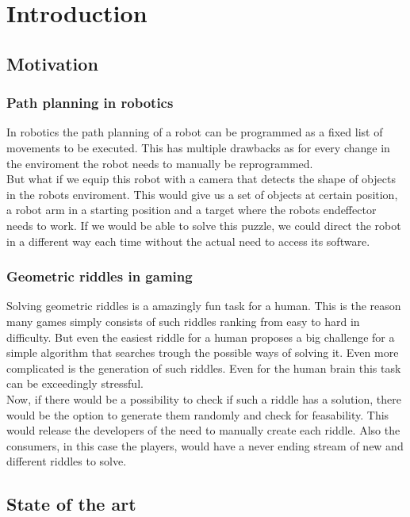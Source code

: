 \chapter{Introduction}
\label{cha:Introduction}

\section{Motivation}
\subsection{Path planning in robotics}
In robotics the path planning of a robot can be programmed as a fixed list of movements to be executed. This has multiple drawbacks as for every change in the enviroment the robot needs to manually be reprogrammed.\\
But what if we equip this robot with a camera that detects the shape of objects in the robots enviroment. This would give us a set of objects at certain position, a robot arm in a starting position and a target where the robots endeffector needs to work. If we would be able to solve this puzzle, we could direct the robot in a different way each time without the actual need to access its software.


\subsection{Geometric riddles in gaming}
Solving geometric riddles is a amazingly fun task for a human. This is the reason many games simply consists of such riddles ranking from easy to hard in difficulty. But even the easiest riddle for a human proposes a big challenge for a simple algorithm that searches trough the possible ways of solving it. Even more complicated is the generation of such riddles. Even for the human brain this task can be exceedingly stressful.\\
 Now, if there would be a possibility to check if such a riddle has a solution, there would be the option to generate them randomly and check for feasability. This would release the developers of the need to manually create each riddle. Also the consumers, in this case the players, would have a never ending stream of new and different riddles to solve.

\section{State of the art}


